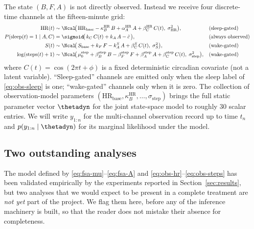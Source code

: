 The state $(B,F,A)$ is not directly observed. Instead we receive four
discrete-time channels at the fifteen-minute grid:
\begin{align}
  \mathrm{HR}(t) &\sim
    \Ncal\!\bigl(\,\mathrm{HR}_{\mathrm{base}}
                  - \kappa_B^{\mathrm{HR}}\,B
                  + \alpha_A^{\mathrm{HR}}\,A
                  + \beta_C^{\mathrm{HR}}\,C(t),\;
                  \sigma_{\mathrm{HR}}^2\bigr),
    && \text{(sleep-gated)} \label{eq:obs-hr}\\
  P(\mathrm{sleep}(t)=1\mid A,C) &=
    \sigmoid\!\bigl(\,k_C\,C(t) + k_A\,A - \tilde c\,\bigr),
    && \text{(always observed)} \label{eq:obs-sleep}\\
  S(t) &\sim
    \Ncal\!\bigl(\,S_{\mathrm{base}} + k_F\,F - k_A^S\,A
                  + \beta_C^S\,C(t),\;
                  \sigma_S^2\bigr),
    && \text{(wake-gated)} \label{eq:obs-stress}\\
  \log(\mathrm{steps}(t)+1) &\sim
    \Ncal\!\bigl(\,\mu_0^{\mathrm{step}} + \beta_B^{\mathrm{step}}\,B
                  - \beta_F^{\mathrm{step}}\,F + \beta_A^{\mathrm{step}}\,A
                  + \beta_C^{\mathrm{step}}\,C(t),\;
                  \sigma_{\mathrm{step}}^2\bigr),
    && \text{(wake-gated)} \label{eq:obs-steps}
\end{align}
where $C(t) = \cos(2\pi t + \phi)$ is a fixed deterministic circadian
covariate (not a latent variable). ``Sleep-gated'' channels are emitted
only when the sleep label of \eqref{eq:obs-sleep} is one; ``wake-gated''
channels only when it is zero. The collection of observation-model
parameters $(\mathrm{HR}_{\mathrm{base}},\kappa_B^{\mathrm{HR}},\dots,\sigma_{\mathrm{step}})$
brings the full static parameter vector $\thetadyn$ for the joint
state-space model to roughly $30$ scalar entries. We will write
$y_{1:n}$ for the multi-channel observation record up to time $t_n$ and
$p(y_{1:n}\mid \thetadyn)$ for its marginal likelihood under the model.

\subsection{Two outstanding analyses}\label{sec:fsa-remarks}

The model defined by
\eqref{eq:fsa-mu}--\eqref{eq:fsa-A} and
\eqref{eq:obs-hr}--\eqref{eq:obs-steps} has been validated empirically by
the experiments reported in Section~\ref{sec:results}, but two analyses
that we would expect to be present in a complete treatment are
\emph{not yet} part of the project. We flag them here, before any of the
inference machinery is built, so that the reader does not mistake their
absence for completeness.

